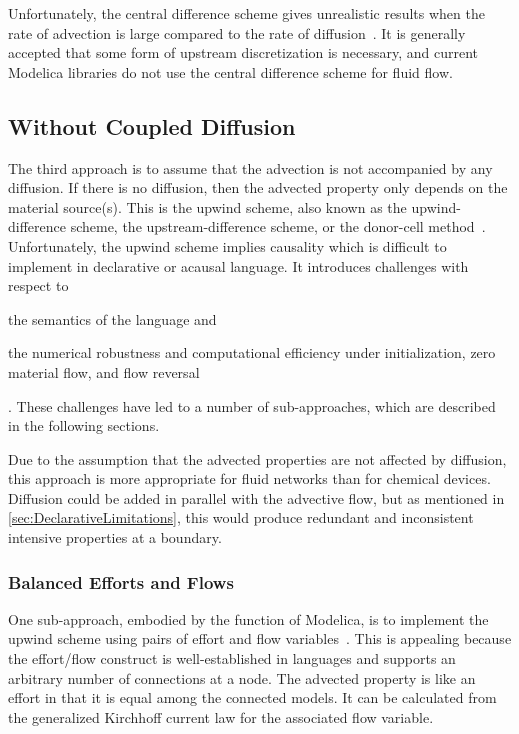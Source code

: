 Unfortunately, the central difference scheme gives unrealistic results when the rate of advection is large compared to the rate of diffusion~\cite{Patankar1980}. %
 It is generally accepted that some form of upstream discretization is necessary, and current Modelica libraries do not use the central difference scheme for fluid flow.



\subsection{Without Coupled Diffusion}
\label{sec:NoDiffusion}


The third approach is to assume that the advection is not accompanied by any diffusion.  If there is no diffusion, then the advected property only depends on the material source(s).  This is the upwind scheme, also known as the upwind-difference scheme, the upstream-difference scheme, or the donor-cell method~\cite{Patankar1980}.  Unfortunately, the upwind scheme implies causality which is difficult to implement in declarative or acausal language.  It introduces challenges with respect to \begin{inparaenum}[(1)]\item the semantics of the language and \item the numerical robustness and computational efficiency under initialization, zero material flow, and flow reversal\end{inparaenum}.  These challenges have led to a number of sub-approaches, which are described in the following sections.

Due to the assumption that the advected properties are not affected by diffusion, this approach is more appropriate for fluid networks than for chemical devices.  Diffusion could be added in parallel with the advective flow, but as mentioned in \autoref{sec:DeclarativeLimitations}, this would produce redundant and inconsistent intensive properties at a boundary.


\subsubsection{Balanced Efforts and Flows}
\label{sec:BalancedEffortFlow}

One sub-approach, embodied by the  function of Modelica, is to implement the upwind scheme using pairs of effort and flow variables~\cite{Elmqvist2003}.  This is appealing because the effort\slash{}flow construct is well-established in  languages and supports an arbitrary number of connections at a node.  The advected property is like an effort in that it is equal among the connected models.  It can be calculated from the generalized Kirchhoff current law for the associated flow variable.

